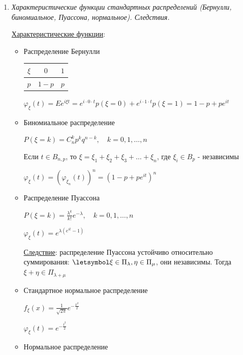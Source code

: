 \begin{enumerate}
\begin{enumerate}
        $\{\xi_n\} \rightrightarrows \xi \Longleftrightarrow \varphi_{\xi_n}(t) \longrightarrow \varphi_\xi(t) \forall t \in \Real$
    \end{enumerate}

    \item \textit{Характеристические функции стандартных распределений (Бернулли, биномиальное, Пуассона, нормальное). Следствия.}

    \hyperlink{characteristicfunctionofstandarddistributions}{Характеристические функции}: 

    \begin{itemize}
        \item Распределение Бернулли

        \begin{tabular}{c|c|c}
            $\xi$ & $0$     & $1$    \\
            \hline
            $p$   & $1 - p$ & $p$
        \end{tabular} \qquad\qquad $\varphi_\xi(t) = Ee^{i\xi t} = e^{i \cdot 0 \cdot t} p(\xi = 0) + e^{i \cdot 1 \cdot t} p(\xi = 1) = 1 - p + p e^{it}$

        \item Биномиальное распределение

        $P(\xi = k) = C_n^k p^k q^{n - k}, \quad k = 0, 1, \dots, n$

        Если $t \in B_{n,p}$, то $\xi = \xi_1 + \xi_2 + \xi_3 + \dots + \xi_n$, где $\xi_i \in B_p$ - независимы

        $\varphi_\xi(t) = (\varphi_{\xi_n}(t))^n = (1 - p + p e^{it})^n$

        \item Распределение Пуассона

        $P(\xi = k) = \frac{\lambda^k}{k!} e^{-\lambda}, \quad k = 0, 1, \dots, n$

        $\varphi_\xi(t) = e^{\lambda (e^{it} - 1)}$

        \underline{Следствие}: распределение Пуассона устойчиво относительно суммирования: $\letsymbol \xi \in \Pi_\lambda, \eta \in \Pi_\mu$, они независимы. Тогда $\xi + \eta \in \Pi_{\lambda + \mu}$

        \item Стандартное нормальное распределение

        $f_\xi(x) = \frac{1}{\sqrt{2\pi}} e^{-\frac{x^2}{2}}$

        $\varphi_\xi(t) = e^{-\frac{t^2}{2}}$

        \item Нормальное распределение


\end{itemize}
\end{enumerate}
